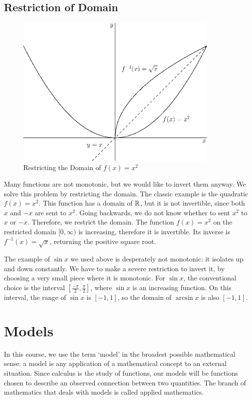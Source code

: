 \documentclass[fleqn]{report}
\begin{document}
\subsection{Restriction of Domain}
\label{restriction}

\begin{figure}[t]
\centering
\includegraphics[width=10cm]{figure36.eps}
\caption{Restricting the Domain of $f(x) = x^2$}
\label{figure-restriction}
\end{figure}

Many functions are not monotonic, but we would like to invert
them anyway. We solve this problem by restricting the domain.
The classic example is the quadratic $f(x) = x^2$. This
function has a domain of $\mathbb{R}$, but it is not invertible,
since both $x$ and $-x$ are sent to $x^2$. Going backwards,
we do not know whether to sent $x^2$ to $x$ or $-x$.
Therefore, we restrict the domain. The function $f(x) = x^2$
on the restricted domain $[0, \infty)$ is increasing,
therefore it is invertible. Its inverse is $f^{-1}(x) =
\sqrt{x}$, returning the positive square root.

The example of $\sin x$ we used above is desperately not
monotonic: it isolates up and down constantly. We have to make
a severe restriction to invert it, by choosing a very small
piece where it is monotonic. For $\sin x$, the conventional
choice is the interval $\left[ \frac{-\pi}{2}, \frac{\pi}{2}
\right]$, where $\sin x$ is an increasing function. On this
interval, the range of $\sin x$ is $[-1,1]$, so the domain of
$\arcsin x$ is also $[-1,1]$. 

\section{Models}
\label{models}

In this course, we use the term `model' in the broadest
possible mathematical sense: a model is any application of a
mathematical concept to an external situation.  Since calculus
is the study of functions, our models will be functions chosen
to describe an observed connection between two quantities. The
branch of mathematics that deals with models is called applied
mathematics.
\end{document}
